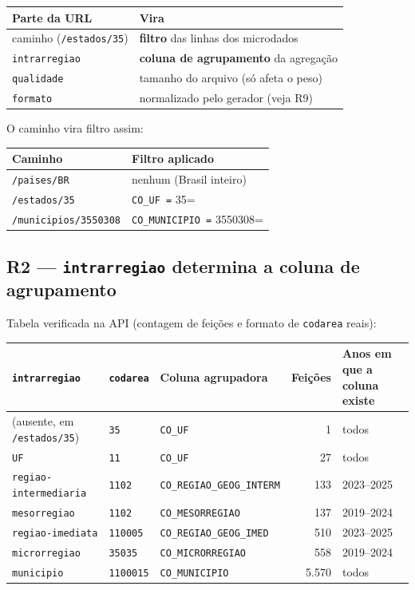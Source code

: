 \documentclass[11pt]{article}
\begin{document}
\begin{center}
\begin{tabular}{ll}
Parte da URL & Vira\\
\hline
caminho (\texttt{/estados/35}) & \textbf{filtro} das linhas dos microdados\\
\texttt{intrarregiao} & \textbf{coluna de agrupamento} da agregação\\
\texttt{qualidade} & tamanho do arquivo (só afeta o peso)\\
\texttt{formato} & normalizado pelo gerador (veja R9)\\
\end{tabular}
\end{center}

O caminho vira filtro assim:

\begin{center}
\begin{tabular}{ll}
Caminho & Filtro aplicado\\
\hline
\texttt{/paises/BR} & nenhum (Brasil inteiro)\\
\texttt{/estados/35} & \texttt{CO\_UF =} 35=\\
\texttt{/municipios/3550308} & \texttt{CO\_MUNICIPIO =} 3550308=\\
\end{tabular}
\end{center}
\subsection{R2 — \texttt{intrarregiao} determina a coluna de agrupamento}
\label{sec:org1a564c3}

Tabela verificada na API (contagem de feições e formato de \texttt{codarea} reais):

\begin{center}
\begin{tabular}{lllrl}
\texttt{intrarregiao} & \texttt{codarea} & Coluna agrupadora & Feições & Anos em que a coluna existe\\
\hline
(ausente, em \texttt{/estados/35}) & \texttt{35} & \texttt{CO\_UF} & 1 & todos\\
\texttt{UF} & \texttt{11} & \texttt{CO\_UF} & 27 & todos\\
\texttt{regiao-intermediaria} & \texttt{1102} & \texttt{CO\_REGIAO\_GEOG\_INTERM} & 133 & 2023–2025\\
\texttt{mesorregiao} & \texttt{1102} & \texttt{CO\_MESORREGIAO} & 137 & 2019–2024\\
\texttt{regiao-imediata} & \texttt{110005} & \texttt{CO\_REGIAO\_GEOG\_IMED} & 510 & 2023–2025\\
\texttt{microrregiao} & \texttt{35035} & \texttt{CO\_MICRORREGIAO} & 558 & 2019–2024\\
\texttt{municipio} & \texttt{1100015} & \texttt{CO\_MUNICIPIO} & 5.570 & todos\\
\end{tabular}
\end{center}
\end{document}
